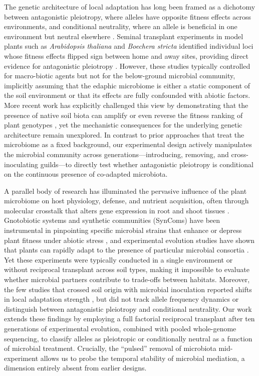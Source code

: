 \documentclass{article}
\begin{document}
The genetic architecture of local adaptation has long been framed as a dichotomy between antagonistic pleiotropy, where alleles have opposite fitness effects across environments, and conditional neutrality, where an allele is beneficial in one environment but neutral elsewhere \citep{Anderson2011Four, Colautti2017Global, Savolainen2013Ecological}.  Seminal transplant experiments in model plants such as \textit{Arabidopsis thaliana} and \textit{Boechera stricta} identified individual loci whose fitness effects flipped sign between home and away sites, providing direct evidence for antagonistic pleiotropy \citep{FournierLevel2011Map, Prasad2012Gain}.  However, these studies typically controlled for macro-biotic agents but not for the below-ground microbial community, implicitly assuming that the edaphic microbiome is either a static component of the soil environment or that its effects are fully confounded with abiotic factors.  More recent work has explicitly challenged this view by demonstrating that the presence of native soil biota can amplify or even reverse the fitness ranking of plant genotypes \citep{Rua2016Home,VanNuland2016Plant}, yet the mechanistic consequences for the underlying genetic architecture remain unexplored.  In contrast to prior approaches that treat the microbiome as a fixed background, our experimental design actively manipulates the microbial community across generations—introducing, removing, and cross-inoculating guilds—to directly test whether antagonistic pleiotropy is conditional on the continuous presence of co-adapted microbiota.

A parallel body of research has illuminated the pervasive influence of the plant microbiome on host physiology, defense, and nutrient acquisition, often through molecular crosstalk that alters gene expression in root and shoot tissues \citep{Berendsen2012Rhizosphere, Finkel2020Single}.  Gnotobiotic systems and synthetic communities (SynComs) have been instrumental in pinpointing specific microbial strains that enhance or depress plant fitness under abiotic stress \citep{Bai2015Functional, Lebeis2015Plant}, and experimental evolution studies have shown that plants can rapidly adapt to the presence of particular microbial consortia \citep{Lau2012Rapid, Schrader2021Microbial}.  Yet these experiments were typically conducted in a single environment or without reciprocal transplant across soil types, making it impossible to evaluate whether microbial partners contribute to trade-offs between habitats.  Moreover, the few studies that crossed soil origin with microbial inoculation reported shifts in local adaptation strength \citep{PankeBuisse2015Soil}, but did not track allele frequency dynamics or distinguish between antagonistic pleiotropy and conditional neutrality.  Our work extends these findings by employing a full factorial reciprocal transplant after ten generations of experimental evolution, combined with pooled whole-genome sequencing, to classify alleles as pleiotropic or conditionally neutral as a function of microbial treatment.  Crucially, the “pulsed” removal of microbiota mid-experiment allows us to probe the temporal stability of microbial mediation, a dimension entirely absent from earlier designs.
\end{document}
